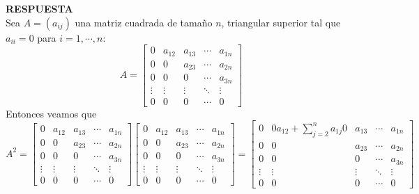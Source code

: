 \documentclass[11pt,letterpaper]{article}
\newcommand{\res}{\textbf{RESPUESTA}\\}
\begin{document}
\begin{enumerate}
\res
Sea $A=(a_{ij})$ una matriz cuadrada de tamaño $n$, triangular superior tal que $a_{ii}=0$ para $i=1, \cdots , n$:
\begin{equation*}
A=\left[ \begin{array}{ccccc}
0& a_{12} & a_{13} & \cdots & a_{1n}\\
0 & 0 & a_{23} & \cdots & a_{2n}\\
0 & 0 & 0 & \cdots & a_{3n}\\
\vdots & \vdots & \vdots & \ddots & \vdots\\
0 & 0 & 0 & \cdots & 0
\end{array}\right]
\end{equation*}
Entonces veamos que 
\begin{equation*}
A^2=\left[ \begin{array}{ccccc}
0& a_{12} & a_{13} & \cdots & a_{1n}\\
0 & 0 & a_{23} & \cdots & a_{2n}\\
0 & 0 & 0 & \cdots & a_{3n}\\
\vdots & \vdots & \vdots & \ddots & \vdots\\
0 & 0 & 0 & \cdots & 0
\end{array}\right]
\left[ \begin{array}{ccccc}
0& a_{12} & a_{13} & \cdots & a_{1n}\\
0 & 0 & a_{23} & \cdots & a_{2n}\\
0 & 0 & 0 & \cdots & a_{3n}\\
\vdots & \vdots & \vdots & \ddots & \vdots\\
0 & 0 & 0 & \cdots & 0
\end{array}\right]= 
\left[ \begin{array}{ccccc}
0 & 0a_{12}+\sum_{j=2}^na_{1j}0 & a_{13} & \cdots & a_{1n}\\
0 & 0 & a_{23} & \cdots & a_{2n}\\
0 & 0 & 0 & \cdots & a_{3n}\\
\vdots & \vdots & \vdots & \ddots & \vdots\\
0 & 0 & 0 & \cdots & 0
\end{array}\right]
\end{equation*}

\end{enumerate}
\end{document}
